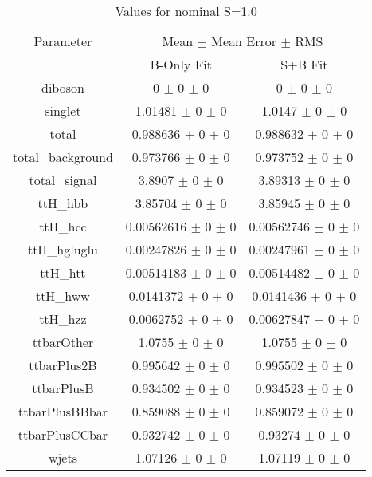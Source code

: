 \begin{table}
\centering
\caption{Values for nominal S=1.0}
\begin{tabular}{ccc}
\toprule
Parameter 	& \multicolumn{2}{c}{Mean $\pm$ Mean Error $\pm$ RMS}\\
 	& B-Only Fit & S+B Fit\\
\midrule
diboson 	& \num{0} $\pm$ \num{0} $\pm$ \num{0} 	& \num{0} $\pm$ \num{0} $\pm$ \num{0}\\
singlet 	& \num{1.01481} $\pm$ \num{0} $\pm$ \num{0} 	& \num{1.0147} $\pm$ \num{0} $\pm$ \num{0}\\
total 	& \num{0.988636} $\pm$ \num{0} $\pm$ \num{0} 	& \num{0.988632} $\pm$ \num{0} $\pm$ \num{0}\\
total\_background 	& \num{0.973766} $\pm$ \num{0} $\pm$ \num{0} 	& \num{0.973752} $\pm$ \num{0} $\pm$ \num{0}\\
total\_signal 	& \num{3.8907} $\pm$ \num{0} $\pm$ \num{0} 	& \num{3.89313} $\pm$ \num{0} $\pm$ \num{0}\\
ttH\_hbb 	& \num{3.85704} $\pm$ \num{0} $\pm$ \num{0} 	& \num{3.85945} $\pm$ \num{0} $\pm$ \num{0}\\
ttH\_hcc 	& \num{0.00562616} $\pm$ \num{0} $\pm$ \num{0} 	& \num{0.00562746} $\pm$ \num{0} $\pm$ \num{0}\\
ttH\_hgluglu 	& \num{0.00247826} $\pm$ \num{0} $\pm$ \num{0} 	& \num{0.00247961} $\pm$ \num{0} $\pm$ \num{0}\\
ttH\_htt 	& \num{0.00514183} $\pm$ \num{0} $\pm$ \num{0} 	& \num{0.00514482} $\pm$ \num{0} $\pm$ \num{0}\\
ttH\_hww 	& \num{0.0141372} $\pm$ \num{0} $\pm$ \num{0} 	& \num{0.0141436} $\pm$ \num{0} $\pm$ \num{0}\\
ttH\_hzz 	& \num{0.0062752} $\pm$ \num{0} $\pm$ \num{0} 	& \num{0.00627847} $\pm$ \num{0} $\pm$ \num{0}\\
ttbarOther 	& \num{1.0755} $\pm$ \num{0} $\pm$ \num{0} 	& \num{1.0755} $\pm$ \num{0} $\pm$ \num{0}\\
ttbarPlus2B 	& \num{0.995642} $\pm$ \num{0} $\pm$ \num{0} 	& \num{0.995502} $\pm$ \num{0} $\pm$ \num{0}\\
ttbarPlusB 	& \num{0.934502} $\pm$ \num{0} $\pm$ \num{0} 	& \num{0.934523} $\pm$ \num{0} $\pm$ \num{0}\\
ttbarPlusBBbar 	& \num{0.859088} $\pm$ \num{0} $\pm$ \num{0} 	& \num{0.859072} $\pm$ \num{0} $\pm$ \num{0}\\
ttbarPlusCCbar 	& \num{0.932742} $\pm$ \num{0} $\pm$ \num{0} 	& \num{0.93274} $\pm$ \num{0} $\pm$ \num{0}\\
wjets 	& \num{1.07126} $\pm$ \num{0} $\pm$ \num{0} 	& \num{1.07119} $\pm$ \num{0} $\pm$ \num{0}\\
\bottomrule
\end{tabular}
\end{table}